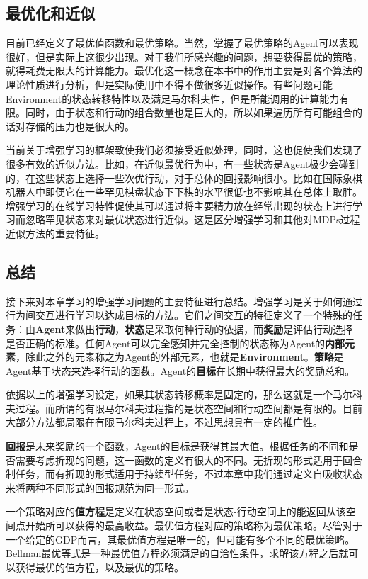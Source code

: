 \documentclass{ctexart}
\begin{document}
        \subsection{最优化和近似}
            目前已经定义了最优值函数和最优策略。当然，掌握了最优策略的Agent可以表现很好，但是实际上这很少出现。对于我们所感兴趣的问题，想要获得最优的策略，就得耗费无限大的计算能力。最优化这一概念在本书中的作用主要是对各个算法的理论性质进行分析，但是实际使用中不得不做很多近似操作。有些问题可能Environment的状态转移特性以及满足马尔科夫性，但是所能调用的计算能力有限。同时，由于状态和行动的组合数量也是巨大的，所以如果遍历所有可能组合的话对存储的压力也是很大的。

            当前关于增强学习的框架致使我们必须接受近似处理，同时，这也促使我们发现了很多有效的近似方法。比如，在近似最优行为中，有一些状态是Agent极少会碰到的，在这些状态上选择一些次优行动，对于总体的回报影响很小。比如在国际象棋机器人中即便它在一些罕见棋盘状态下下棋的水平很低也不影响其在总体上取胜。增强学习的在线学习特性促使其可以通过将主要精力放在经常出现的状态上进行学习而忽略罕见状态来对最优状态进行近似。这是区分增强学习和其他对MDPs过程近似方法的重要特征。

        \subsection{总结}
            接下来对本章学习的增强学习问题的主要特征进行总结。增强学习是关于如何通过行为间交互进行学习以达成目标的方法。它们之间交互的特征定义了一个特殊的任务：由\textbf{Agent}来做出\textbf{行动}，\textbf{状态}是采取何种行动的依据，而\textbf{奖励}是评估行动选择是否正确的标准。任何Agent可以完全感知并完全控制的状态称为Agent的\textbf{内部元素}，除此之外的元素称之为Agent的外部元素，也就是\textbf{Environment}。\textbf{策略}是Agent基于状态来选择行动的函数。Agent的\textbf{目标}在长期中获得最大的奖励总和。

            依据以上的增强学习设定，如果其状态转移概率是固定的，那么这就是一个马尔科夫过程。而所谓的有限马尔科夫过程指的是状态空间和行动空间都是有限的。目前大部分方法都局限在有限马尔科夫过程上，不过思想具有一定的推广性。

            \textbf{回报}是未来奖励的一个函数，Agent的目标是获得其最大值。根据任务的不同和是否需要考虑折现的问题，这一函数的定义有很大的不同。无折现的形式适用于回合制任务，而有折现的形式适用于持续型任务，不过本章中我们通过定义自吸收状态来将两种不同形式的回报规范为同一形式。

            一个策略对应的\textbf{值方程}是定义在状态空间或者是状态-行动空间上的能返回从该空间点开始所可以获得的最高收益。最优值方程对应的策略称为最优策略。尽管对于一个给定的GDP而言，其最优值方程是唯一的，但可能有多个不同的最优策略。Bellman最优等式是一种最优值方程必须满足的自洽性条件，求解该方程之后就可以获得最优的值方程，以及最优的策略。
\end{document}

